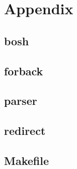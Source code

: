 \section*{Appendix}
\subsection*{bosh}

\subsection*{forback}


\subsection*{parser}


\subsection*{redirect}

\subsection*{Makefile}

